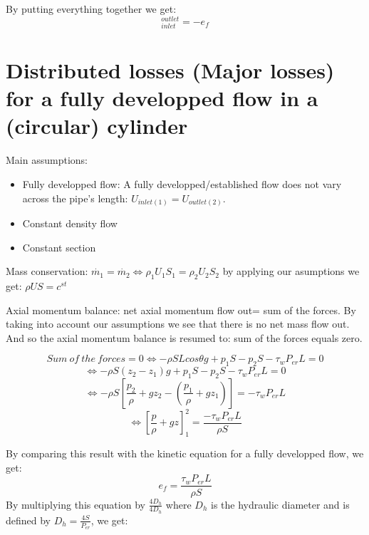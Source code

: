By putting everything together we get:
\begin{equation}
[\alpha \frac{<u>^2}{2}+\frac{<p>}{\rho}+g<z>]_{inlet}^{outlet}=-e_f
\end{equation}


\section{Distributed losses (Major losses) for a fully developped flow in a (circular) cylinder}

Main assumptions:
\begin{itemize}
\item Fully developped flow: A fully developped/established flow does not vary across the pipe's length: $U_{inlet(1)}=U_{outlet(2)}$.
\item Constant density flow
\item Constant section
\end{itemize}

Mass conservation: $\dot{m_1}=\dot{m_2} \Leftrightarrow \rho_1 U_1S_1=\rho_2 U_2S_2$ by applying our asumptions we get: $\rho US=c^{st}$ 

Axial momentum balance: net axial momentum flow out= sum of the forces. By taking into account our assumptions we see that there is no net mass flow out. And so the axial momentum balance is resumed to: sum of the forces equals zero.

\begin{equation}
Sum \ of \ the \ forces=0 \Leftrightarrow -\rho SL cos \theta g+ p_1 S-p_2 S- \tau_w P_{er} L=0
\end{equation}
\begin{equation}
\Leftrightarrow  -\rho S(z_2-z_1) g+ p_1 S-p_2 S- \tau_w P_{er} L=0
\end{equation}
\begin{equation}
\Leftrightarrow  -\rho S[\frac{p_2}{\rho}+gz_2-(\frac{p_1}{\rho}+gz_1)]=-\tau_w P_{er} L
\end{equation}
\begin{equation}
\Leftrightarrow [\frac{p}{\rho}+gz]_1^2=\frac{-\tau_w P_{er} L}{\rho S }
\end{equation}

By comparing this result with the kinetic equation for a fully developped flow, we get:
\begin{equation}
e_f=\frac{\tau_w P_{er} L}{\rho S }
\end{equation}
By multiplying this equation by $\frac{4D_h}{4D_h}$ where $D_h$ is the hydraulic diameter and is defined by $D_h=\frac{4S}{P_{er}}$, we get:

